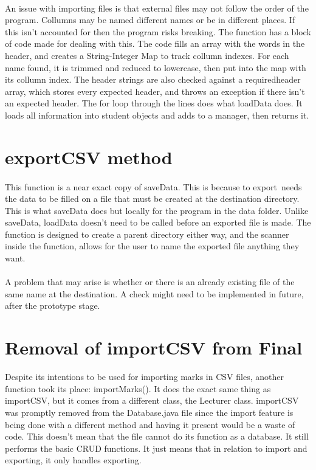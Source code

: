 \paragraph{}
An issue with importing files is that external files may not follow the order of the program.
Collumns may be named different names or be in different places. If this isn't accounted for then the program risks breaking.
The function has a block of code made for dealing with this. The code 
fills an array with the words in the header, and creates a String-Integer Map 
to track collumn indexes. For each name found, it is trimmed and reduced to lowercase, then put into the map with its collumn index. 
The header strings are also checked against a requiredheader array, which stores every expected header,
and throws an exception if there isn't an expected header.
The for loop through the lines does what loadData does. It loads all information into 
student objects and adds to a manager, then returns it. 

\section{exportCSV method}
\paragraph{}
This function is a near exact copy of saveData. This is because to export\
needs the data to be filled on a file that must be created at the destination directory.
This is what saveData does but locally for the program in the data folder.
Unlike saveData, loadData doesn't need to be called before an exported file is made.
The function is designed to create a parent directory either way, and the scanner inside the function, 
allows for the user to name the exported file anything they want.

\paragraph{}
A problem that may arise is whether or there is an already existing file of the same name 
at the destination. A check might need to be implemented in future, after the prototype stage.

\section{Removal of importCSV from Final}
Despite its intentions to be used for importing marks in CSV files, another function took its place: importMarks(). It does the exact 
same thing as importCSV, but it comes from a different class, the Lecturer class. 
importCSV was promptly removed from the Database.java file since the import feature is being done with a different 
method and having it present would be a waste of code. 
This doesn't mean that the file cannot do its function as a database. It still performs the basic CRUD functions.
It just means that in relation to import and exporting, it only handles exporting.
 